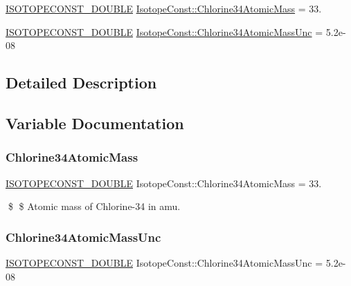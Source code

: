 \begin{DoxyCompactItemize}
\item 
\mbox{\hyperlink{group___isotope_const-_macros_ga8f45a7272ce02c0b4c65c44636ed719a}{I\+S\+O\+T\+O\+P\+E\+C\+O\+N\+S\+T\+\_\+\+D\+O\+U\+B\+LE}} \mbox{\hyperlink{group___isotope_const-_chlorine-_cl34_ga5cf775bf54906de8e3aa3b4cd3dbd041}{Isotope\+Const\+::\+Chlorine34\+Atomic\+Mass}} = 33.
\item 
\mbox{\hyperlink{group___isotope_const-_macros_ga8f45a7272ce02c0b4c65c44636ed719a}{I\+S\+O\+T\+O\+P\+E\+C\+O\+N\+S\+T\+\_\+\+D\+O\+U\+B\+LE}} \mbox{\hyperlink{group___isotope_const-_chlorine-_cl34_ga61a4effe5df7eba0bd050ce596afff7f}{Isotope\+Const\+::\+Chlorine34\+Atomic\+Mass\+Unc}} = 5.\+2e-\/08
\end{DoxyCompactItemize}


\subsection{Detailed Description}


\subsection{Variable Documentation}
\mbox{\label{group___isotope_const-_chlorine-_cl34_ga5cf775bf54906de8e3aa3b4cd3dbd041}} 
\subsubsection{\texorpdfstring{Chlorine34\+Atomic\+Mass}{Chlorine34AtomicMass}}
{\footnotesize\ttfamily \mbox{\hyperlink{group___isotope_const-_macros_ga8f45a7272ce02c0b4c65c44636ed719a}{I\+S\+O\+T\+O\+P\+E\+C\+O\+N\+S\+T\+\_\+\+D\+O\+U\+B\+LE}} Isotope\+Const\+::\+Chlorine34\+Atomic\+Mass = 33.}

\$ \$ Atomic mass of Chlorine-\/34 in amu. \mbox{\label{group___isotope_const-_chlorine-_cl34_ga61a4effe5df7eba0bd050ce596afff7f}} 
\subsubsection{\texorpdfstring{Chlorine34\+Atomic\+Mass\+Unc}{Chlorine34AtomicMassUnc}}
{\footnotesize\ttfamily \mbox{\hyperlink{group___isotope_const-_macros_ga8f45a7272ce02c0b4c65c44636ed719a}{I\+S\+O\+T\+O\+P\+E\+C\+O\+N\+S\+T\+\_\+\+D\+O\+U\+B\+LE}} Isotope\+Const\+::\+Chlorine34\+Atomic\+Mass\+Unc = 5.\+2e-\/08}

